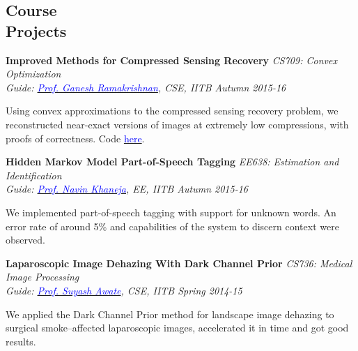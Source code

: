 \documentclass[margin,line]{res}
\newenvironment{list1}{
  \begin{list}{\ding{113}}{%
      \setlength{\itemsep}{0in}
      \setlength{\parsep}{0in} \setlength{\parskip}{0in}
      \setlength{\topsep}{0in} \setlength{\partopsep}{0in} 
      \setlength{\leftmargin}{0.17in}}}{\end{list}}
\begin{document}
\begin{resume}
\vspace*{-0.13in}

\section{\sc Course \\Projects}
{\bf Improved Methods for Compressed Sensing Recovery} \hfill {\it CS709: Convex Optimization} \\
{\em Guide: \href{https://www.cse.iitb.ac.in/~ganesh/}{\textcolor{blue}{Prof. Ganesh Ramakrishnan}}, CSE, IITB \hfill Autumn 2015-16} \\
\vspace*{-.15in}
\begin{list1}
\item[] Using convex approximations to the compressed sensing recovery problem, we reconstructed near-exact versions of images at extremely low compressions, with proofs of correctness. Code \href{https://github.com/alankarkotwal/cs-rank-minimization}{\textcolor{blue} {here}}.
\end{list1}

\vspace*{-0.13in}

{\bf Hidden Markov Model Part-of-Speech Tagging} \hfill \textit{EE638: Estimation and Identification} \\
{\em Guide: \href{https://www.ee.iitb.ac.in/course/~ee638/Navin}{\textcolor{blue}{Prof. Navin Khaneja}}, EE, IITB \hfill Autumn 2015-16} \\
\vspace*{-.15in}
\begin{list1}
\item[] We implemented part-of-speech tagging with support for unknown words. An error rate of around 5\% and capabilities of the system to discern context were observed.
\end{list1}

\vspace*{-0.13in}

{\bf Laparoscopic Image Dehazing With Dark Channel Prior} \hfill \textit{CS736: Medical Image Processing} \\
{\em Guide: \href{https://www.cse.iitb.ac.in/~suyash}{\textcolor{blue}{Prof. Suyash Awate}}, CSE, IITB \hfill Spring 2014-15} \\
\vspace*{-.15in}
\begin{list1}
\item[] We applied the Dark Channel Prior method for landscape image dehazing to surgical smoke--affected laparoscopic images, accelerated it in time and got good results.
\end{list1}


\end{resume}
\end{document}
